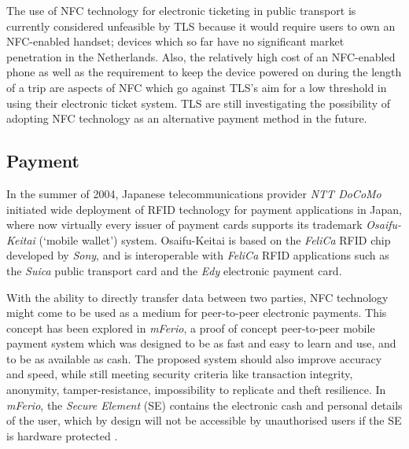 The use of NFC technology for electronic ticketing in public transport is currently considered unfeasible by TLS because it would require users to own an NFC-enabled handset; devices which so far have no significant market penetration in the Netherlands.
Also, the relatively high cost of an NFC-enabled phone as well as the requirement to keep the device powered on during the length of a trip are aspects of NFC which go against TLS's aim for a low threshold in using their electronic ticket system.
TLS are still investigating the possibility of adopting NFC technology as an alternative payment method in the future. \cite{OVchipkaart} %



\subsection{Payment}
In the summer of 2004, Japanese telecommunications provider \textit{NTT DoCoMo} initiated wide deployment of RFID technology for payment applications in Japan, where now virtually every issuer of payment cards supports its trademark \textit{Osaifu-Keitai} (`mobile wallet') system.
Osaifu-Keitai is based on the \textit{FeliCa} RFID chip developed by \textit{Sony}, and is interoperable with \textit{FeliCa} RFID applications such as the \textit{Suica} public transport card and the \textit{Edy} electronic payment card.
\cite{yamauchi2006intensive}


With the ability to directly transfer data between two parties, NFC technology might come to be used as a medium for peer-to-peer electronic payments.
This concept has been explored in \textit{mFerio}, a proof of concept peer-to-peer mobile payment system which was designed to be as fast and easy to learn and use, and to be as available as cash.
The proposed system should also improve accuracy and speed, while still meeting security criteria like transaction integrity, anonymity, tamper-resistance, impossibility to replicate and theft resilience. 
In \textit{mFerio}, the \textit{Secure Element} (SE) contains the electronic cash and personal details of the user, which by design will not be accessible by unauthorised users if the SE is hardware protected \cite{1555846}.

